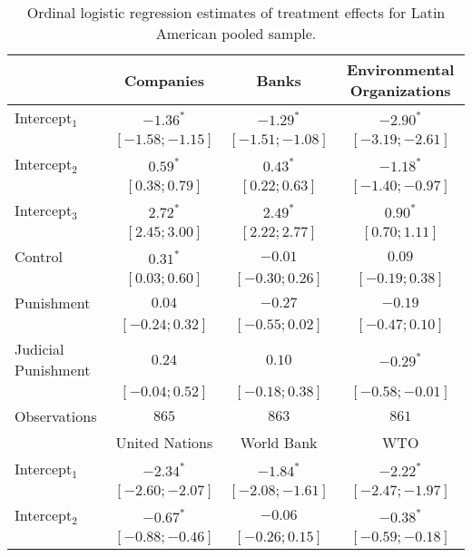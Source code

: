 \begin{table}[h]
\begin{center}
\caption{Ordinal logistic regression estimates of treatment effects for Latin American pooled sample.}
\begin{threeparttable}
\begin{tabular}{l c c c}
\hline
 & Companies & Banks & Environmental
Organizations \\
\hline
Intercept$_1$       & $-1.36^{*}$       & $-1.29^{*}$       & $-2.90^{*}$       \\
                    & $ [-1.58; -1.15]$ & $ [-1.51; -1.08]$ & $ [-3.19; -2.61]$ \\
Intercept$_2$       & $0.59^{*}$        & $0.43^{*}$        & $-1.18^{*}$       \\
                    & $ [ 0.38;  0.79]$ & $ [ 0.22;  0.63]$ & $ [-1.40; -0.97]$ \\
Intercept$_3$       & $2.72^{*}$        & $2.49^{*}$        & $0.90^{*}$        \\
                    & $ [ 2.45;  3.00]$ & $ [ 2.22;  2.77]$ & $ [ 0.70;  1.11]$ \\
Control             & $0.31^{*}$        & $-0.01$           & $0.09$            \\
                    & $ [ 0.03;  0.60]$ & $ [-0.30;  0.26]$ & $ [-0.19;  0.38]$ \\
Punishment          & $0.04$            & $-0.27$           & $-0.19$           \\
                    & $ [-0.24;  0.32]$ & $ [-0.55;  0.02]$ & $ [-0.47;  0.10]$ \\
Judicial Punishment & $0.24$            & $0.10$            & $-0.29^{*}$       \\
                    & $ [-0.04;  0.52]$ & $ [-0.18;  0.38]$ & $ [-0.58; -0.01]$ \\
\hline
Observations        & $865$             & $863$             & $861$             \\
\hline
 & United Nations & World Bank & WTO \\
\hline
Intercept$_1$       & $-2.34^{*}$       & $-1.84^{*}$       & $-2.22^{*}$       \\
                    & $ [-2.60; -2.07]$ & $ [-2.08; -1.61]$ & $ [-2.47; -1.97]$ \\
Intercept$_2$       & $-0.67^{*}$       & $-0.06$           & $-0.38^{*}$       \\
                    & $ [-0.88; -0.46]$ & $ [-0.26;  0.15]$ & $ [-0.59; -0.18]$ \\

\end{tabular}
\end{threeparttable}
\end{center}
\end{table}
